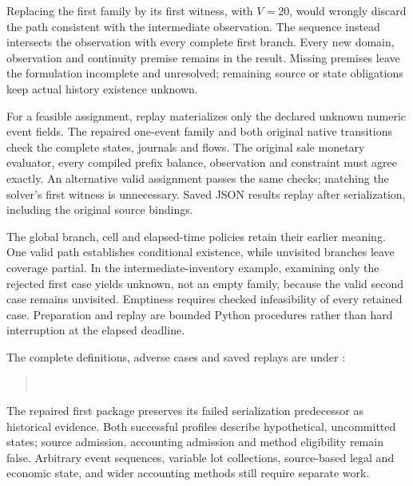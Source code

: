 Replacing the first family by its first witness, with \(V=20\), would wrongly
discard the path consistent with the intermediate observation. The sequence
instead intersects the observation with every complete first branch. Every
new domain, observation and continuity premise remains in the result. Missing
premises leave the formulation incomplete and unresolved; remaining source or
state obligations keep actual history existence unknown.

For a feasible assignment, replay materializes only the declared unknown
numeric event fields. The repaired one-event family and both original native
transitions check the complete states, journals and flows. The original sale
monetary evaluator, every compiled prefix balance, observation and constraint
must agree exactly. An alternative valid assignment passes the same checks;
matching the solver's first witness is unnecessary. Saved JSON results replay
after serialization, including the original source bindings.

The global branch, cell and elapsed-time policies retain their earlier meaning.
One valid path establishes conditional existence, while unvisited branches
leave coverage partial. In the intermediate-inventory example, examining only
the rejected first case yields unknown, not an empty family, because the valid
second case remains unvisited. Emptiness requires checked infeasibility of every
retained case. Preparation and replay are bounded Python procedures rather than
hard interruption at the elapsed deadline.

The complete definitions, adverse cases and saved replays are under
:
\begin{quote}\small
{}\\
\end{quote}
The repaired first package preserves its failed serialization predecessor as
historical evidence. Both successful profiles describe hypothetical, uncommitted
states; source admission, accounting admission and method eligibility remain
false. Arbitrary event sequences, variable lot collections, source-based legal
and economic state, and wider accounting methods still require separate work.
